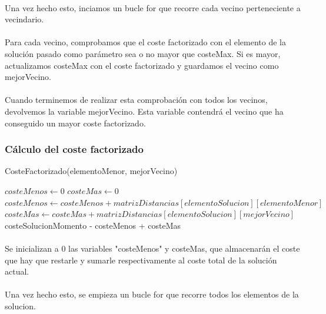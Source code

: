 \documentclass{article}
\begin{document}
		\paragraph{}Una vez hecho esto, inciamos un bucle for que recorre cada vecino perteneciente a vecindario.
		
		\paragraph{}Para cada vecino, comprobamos que el coste factorizado con el elemento de la solución pasado como parámetro sea o no mayor que costeMax. Si es mayor, actualizamos costeMax con el coste factorizado y guardamos el vecino como mejorVecino.
		
		\paragraph{}Cuando terminemos de realizar esta comprobación con todos los vecinos, devolvemos la variable mejorVecino. Esta variable contendrá el vecino que ha conseguido un mayor coste factorizado.
	
		\subsubsection{Cálculo del coste factorizado}
		
		\begin{algorithm}[H]
			\caption{CosteFactorizado(elementoMenor, mejorVecino)}
			\begin{algorithmic}
				\STATE $costeMenos \leftarrow 0$
				\STATE $costeMas \leftarrow 0$
				\STATE $costeMenos \leftarrow costeMenos + matrizDistancias[elementoSolucion][elementoMenor]$
				\STATE $costeMas \leftarrow costeMas+matrizDistancias[elementoSolucion][mejorVecino]$
				\ENDIF
				\ENDFOR
				\RETURN costeSolucionMomento - costeMenos + costeMas	
			\end{algorithmic}
		\end{algorithm}
	
			\paragraph{}Se inicializan a 0 las variables "costeMenos" y costeMas, que almacenarán el coste que hay que restarle y sumarle respectivamente al coste total de la solución actual.
		
		\paragraph{}Una vez hecho esto, se empieza un bucle for que recorre todos los elementos de la solucion.
		
\end{document}
